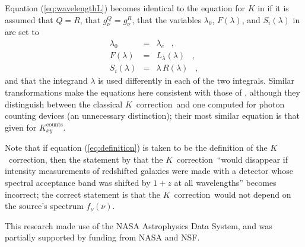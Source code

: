 \documentclass[preprint]{aastex}
\newcommand{\kcorrection}{$K$~correction}
\newcommand{\lambdaemit}{\lambda_e}
\begin{document}
Equation (\ref{eq:wavelengthL}) becomes identical to the equation for
$K$ in \citet{oke68a} if it is assumed that $Q=R$, that
$g^Q_{\nu}=g^R_{\nu}$, that the variables $\lambda_0$,
$F(\lambda)$, and $S_i(\lambda)$ in \citet{oke68a} are set to
\begin{eqnarray}\displaystyle
\lambda_0 & = & \lambdaemit \;\;\;, \nonumber \\
F(\lambda) & = & L_{\lambda}(\lambda) \;\;\;, \nonumber \\
S_i(\lambda) & = & \lambda\,R(\lambda) \;\;\;,
\end{eqnarray}
and that the integrand $\lambda$ is used differently in each of the
two integrals.  Similar transformations make the equations here
consistent with those of \citet{kim96a}, although they distinguish
between the classical \kcorrection\ and one computed for photon
counting devices (an unnecessary distinction); their most similar
equation is that given for $K^\mathrm{counts}_{xy}$.

Note that if equation (\ref{eq:definition}) is taken to be the
definition of the \kcorrection, then the statement by \citet{oke68a}
that the \kcorrection\ ``would disappear if intensity measurements of
redshifted galaxies were made with a detector whose spectral
acceptance band was shifted by $1+z$ at all wavelengths'' becomes
incorrect; the correct statement is that the \kcorrection\ would not
depend on the source's spectrum $f_{\nu}(\nu)$.

\acknowledgements This research made use of the NASA Astrophysics Data
System, and was partially supported by funding from NASA and NSF.



\end{document}
